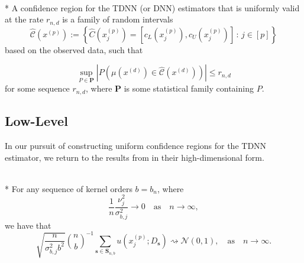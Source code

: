 \begin{boxD}
	\begin{dfn}\mbox{}\\*
		A confidence region for the TDNN (or DNN) estimators that is uniformly valid at the rate $r_{n,d}$ is a family of random intervals
		\begin{equation}
			\hat{\mathcal{C}}\left(x^{(p)}\right)
			:= \left\{\hat{C}(x^{(p)}_{j})
			= \left[c_{L}(x^{(p)}_{j}), c_{U}(x^{(p)}_{j})\right]\, : \, j \in [p]\right\}
		\end{equation}
		based on the observed data, such that
	
		\begin{equation}
			\sup_{P \in \mathbf{P}} \left| P\left(\mu(x^{(d)}) \in \hat{\mathcal{C}}\left(x^{(d)}\right)\right) \right| \leq r_{n,d}
		\end{equation}
		for some sequence $r_{n,d}$, where $\mathbf{P}$ is some statistical family containing $P$.
	\end{dfn}
\end{boxD}

\subsection{Low-Level}
In our pursuit of constructing uniform confidence regions for the TDNN estimator, we return to the results from \citet{ritzwoller_uniform_2024} in their high-dimensional form.

\begin{boxD}
	\begin{thm}\label{thm:rit4_1}\mbox{}\\*
		For any sequence of kernel orders $b=b_n$, where
		\begin{equation}
			\frac{1}{n} \frac{\nu_j^2}{\sigma_{b, j}^2} \rightarrow 0
			\quad \text{as} \quad
			n \rightarrow \infty,
		\end{equation}
		we have that
		\begin{equation}
			\sqrt{\frac{n}{\sigma_{b, j}^2 b^2}} \binom{n}{b}^{-1} \sum_{\mathbf{s} \in \mathbf{S}_{n, b}} u\left(x^{(p)}_{j} ; D_{\mathbf{s}}\right) \rightsquigarrow \mathcal{N}(0,1),
			\quad \text{as} \quad
			n \rightarrow \infty.
		\end{equation}
	\end{thm}
\end{boxD}

